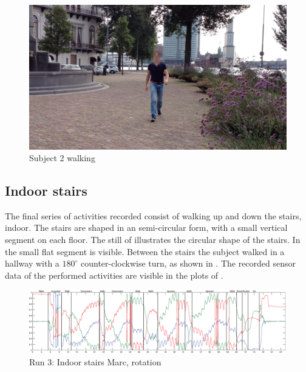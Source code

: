 \begin{figure}
\centering
  \includegraphics[width=1\textwidth]{./Figures/chapter6/data_collection/stills/roemer_walk.png}
  \caption[Recording still 7]{Subject 2 walking}
  \label{fig:data_gathering_still_2_walk}
\end{figure}



\subsection{Indoor stairs}\label{subsec:indoor_stairs}
The final series of activities recorded consist of walking up and down the stairs, indoor.
The stairs are shaped in an semi-circular form, with a small vertical segment on each floor.
The still of  illustrates the circular shape of the stairs.
In  the small flat segment is visible.
Between the stairs the subject walked in a hallway with a $180^{\circ}$ counter-clockwise turn, as shown in .
The recorded sensor data of the performed activities are visible in the plots of .

\begin{figure}
\centering
  \includegraphics[width=1\textwidth]{./Figures/chapter6/data_collection/stairs-1-marc/data_plot_rot_annotated.eps}
  \caption[R3: rotation]{Run 3: Indoor stairs Marc, rotation}
  \label{fig:data_gathering_run_3_rot}
\end{figure}

